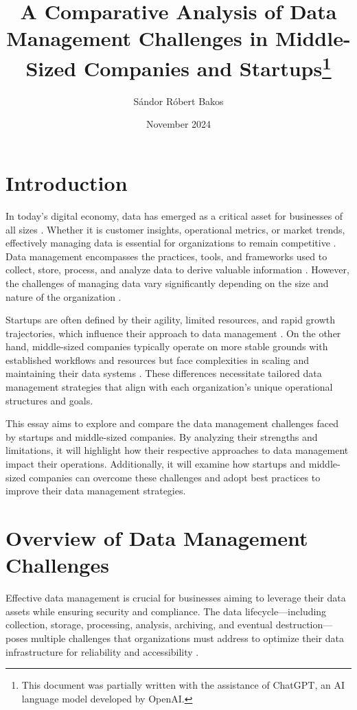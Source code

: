 \documentclass{article}
\title{A Comparative Analysis of Data Management Challenges in Middle-Sized Companies and Startups\thanks{This document was partially written with the assistance of ChatGPT, an AI language model developed by OpenAI.\cite{openai2024chatgpt}}}
\author{Sándor Róbert Bakos}
\date{November 2024}
\begin{document}
\maketitle

\section*{Introduction} 

In today’s digital economy, data has emerged as a critical asset for businesses of all sizes \cite{mcafee2012bigdata}. Whether it is customer insights, operational metrics, or market trends, effectively managing data is essential for organizations to remain competitive \cite{redman2013credibility}. Data management encompasses the practices, tools, and frameworks used to collect, store, process, and analyze data to derive valuable information \cite{dama2017dmbook}. However, the challenges of managing data vary significantly depending on the size and nature of the organization \cite{davenport2014bigdata}.

Startups are often defined by their agility, limited resources, and rapid growth trajectories, which influence their approach to data management \cite{ries2011leanstartup}. On the other hand, middle-sized companies typically operate on more stable grounds with established workflows and resources but face complexities in scaling and maintaining their data systems \cite{european2015smedef}. These differences necessitate tailored data management strategies that align with each organization's unique operational structures and goals.

This essay aims to explore and compare the data management challenges faced by startups and middle-sized companies. By analyzing their strengths and limitations, it will highlight how their respective approaches to data management impact their operations. Additionally, it will examine how startups and middle-sized companies can overcome these challenges and adopt best practices to improve their data management strategies.

\section*{Overview of Data Management Challenges}

Effective data management is crucial for businesses aiming to leverage their data assets while ensuring security and compliance. The data lifecycle—including collection, storage, processing, analysis, archiving, and eventual destruction—poses multiple challenges that organizations must address to optimize their data infrastructure for reliability and accessibility \cite{dama2017}.
\end{document}
